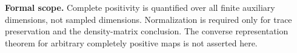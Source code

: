 \textbf{Formal scope.} Complete positivity is quantified over all finite auxiliary dimensions, not sampled dimensions. Normalization is required only for trace preservation and the density-matrix conclusion. The converse representation theorem for arbitrary completely positive maps is not asserted here.





